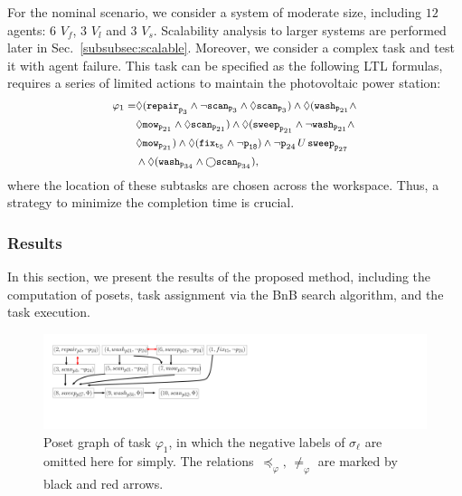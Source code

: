 For the nominal scenario, we consider a system of moderate size,
including $12$ agents: 6 $V_f$, 3 $V_l$ and 3 $V_s$.
Scalability analysis to larger systems are performed later in Sec.~\ref{subsubsec:scalable}.
Moreover, we consider a complex task and test it with agent failure.
This task can be specified as the following LTL formulas,
requires a series of limited actions to
maintain the photovoltaic power station:
\begin{equation}\footnotesize
\label{eq:task1}
  \begin{aligned}
\varphi_1 = & \Diamond(\texttt{repair}_{\texttt{p}_{3}} \wedge \lnot \texttt{scan}_{\texttt{p}_3} \wedge\Diamond \texttt{scan}_{\texttt{p}_3})
\wedge \Diamond (\texttt{wash}_{\texttt{p}_{21}} \wedge \\
&\Diamond \texttt{mow}_{\texttt{p}_{21}} \wedge \Diamond \texttt{scan}_{\texttt{p}_{21}}) \wedge \Diamond ( \texttt{sweep}_{\texttt{p}_{21}} \wedge \lnot \texttt{wash}_{\texttt{p}_{21}} \wedge\\
& \Diamond \texttt{mow}_{\texttt{p}_{21}}) \wedge \Diamond(\texttt{fix}_{\texttt{t}_5} \wedge \lnot \texttt{p}_{\texttt{18}}) \wedge \lnot \texttt{p}_{24} \,U \, \texttt{sweep}_{\texttt{p}_{27}} \\
&\wedge \Diamond (\texttt{wash}_{\texttt{p}_{34}} \wedge \bigcirc \texttt{scan}_{\texttt{p}_{34}}),
\end{aligned}
\end{equation}
where the location of these subtasks are chosen across the workspace.
Thus, a strategy to minimize the completion time is crucial.



\subsubsection{Results}\label{subsubsec:results}
In this section, we present the results of the proposed method, including the computation of posets,
task assignment via the BnB search algorithm, and the task execution.

\begin{figure}[t!]
		\centering%
		\includegraphics[height = 0.12 \textwidth]{figures/simulation/taskfinal/ipe_poset_graph.pdf}
	\caption{Poset graph of task $\varphi_1$, in which the negative labels of $\sigma_\ell$ are omitted here for simply.
          The relations~$\preceq_\varphi,\, \neq_{\varphi}$ are marked
          by black and red arrows.}
       \label{fig:task12-posets}
\end{figure}

